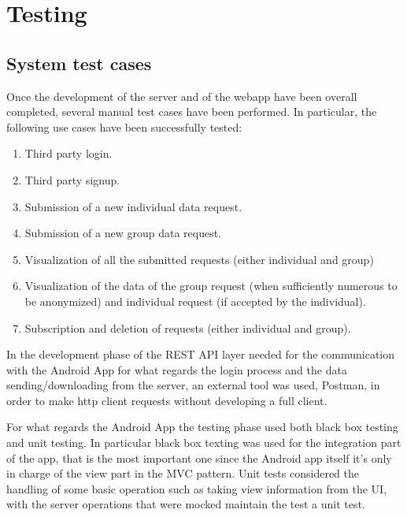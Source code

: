 \section{Testing}


\subsection{System test cases}
Once the development of the server and of the webapp have been overall completed, several manual test cases have been performed. In particular, the following use cases have been successfully tested:

\begin{enumerate}
\item Third party login.
\item Third party signup.
\item Submission of a new individual data request.
\item Submission of a new group data request.
\item Visualization of all the submitted requests (either individual and group)
\item Visualization of the data of the group request (when sufficiently numerous to be anonymized) and individual request (if accepted by the individual).
\item Subscription and deletion of requests (either individual and group).
\end{enumerate}

In the development phase of the REST API layer needed for the communication with the Android App for what regards the login process and the data sending/downloading from the server, an external tool was used, Postman, in order to make http client requests without developing a full client.


For what regards the Android App the testing phase used both black box testing and unit testing.
In particular black box texting was used for the integration part of the app, that is the most important one since the Android app itself it's only in charge of the view part in the MVC pattern.
Unit tests considered the handling of some basic operation such as taking view information from the UI, with the server operations that were mocked maintain the test a unit test. 
